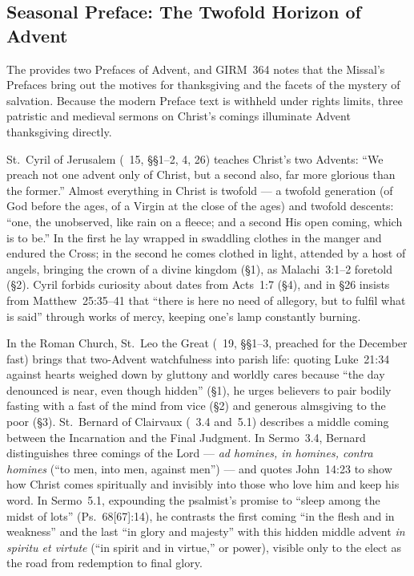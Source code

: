 \subsection{Seasonal Preface: The Twofold Horizon of Advent}

The  provides two Prefaces of Advent, and GIRM~364 notes that the Missal's Prefaces bring out the motives for thanksgiving and the facets of the mystery of salvation. Because the modern Preface text is withheld under rights limits, three patristic and medieval sermons on Christ's comings illuminate Advent thanksgiving directly.

St.~Cyril of Jerusalem (~15, §§1--2, 4, 26) teaches Christ's two Advents: ``We preach not one advent only of Christ, but a second also, far more glorious than the former.'' Almost everything in Christ is twofold --- a twofold generation (of God before the ages, of a Virgin at the close of the ages) and twofold descents: ``one, the unobserved, like rain on a fleece; and a second His open coming, which is to be.'' In the first he lay wrapped in swaddling clothes in the manger and endured the Cross; in the second he comes clothed in light, attended by a host of angels, bringing the crown of a divine kingdom (§1), as Malachi~3:1--2 foretold (§2). Cyril forbids curiosity about dates from Acts~1:7 (§4), and in §26 insists from Matthew~25:35--41 that ``there is here no need of allegory, but to fulfil what is said'' through works of mercy, keeping one's lamp constantly burning.

In the Roman Church, St.~Leo the Great (~19, §§1--3, preached for the December fast) brings that two-Advent watchfulness into parish life: quoting Luke~21:34 against hearts weighed down by gluttony and worldly cares because ``the day denounced is near, even though hidden'' (§1), he urges believers to pair bodily fasting with a fast of the mind from vice (§2) and generous almsgiving to the poor (§3). St.~Bernard of Clairvaux (~3.4 and~5.1) describes a middle coming between the Incarnation and the Final Judgment. In Sermo~3.4, Bernard distinguishes three comings of the Lord --- \emph{ad homines, in homines, contra homines} (``to men, into men, against men'') --- and quotes John~14:23 to show how Christ comes spiritually and invisibly into those who love him and keep his word. In Sermo~5.1, expounding the psalmist's promise to ``sleep among the midst of lots'' (Ps.~68[67]:14), he contrasts the first coming ``in the flesh and in weakness'' and the last ``in glory and majesty'' with this hidden middle advent \emph{in spiritu et virtute} (``in spirit and in virtue,'' or power), visible only to the elect as the road from redemption to final glory.

